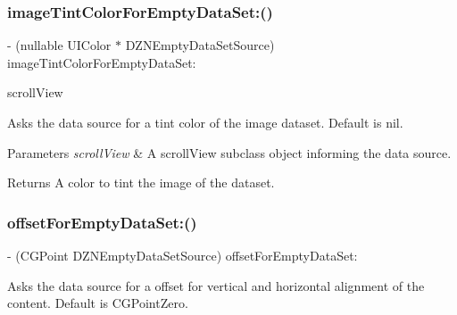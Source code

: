\subsubsection{\texorpdfstring{image\+Tint\+Color\+For\+Empty\+Data\+Set\+:()}{imageTintColorForEmptyDataSet:()}}
{\footnotesize\ttfamily -\/ (nullable U\+I\+Color $\ast$ D\+Z\+N\+Empty\+Data\+Set\+Source) image\+Tint\+Color\+For\+Empty\+Data\+Set\+: \begin{DoxyParamCaption}\item[{(U\+I\+Scroll\+View $\ast$)}]{scroll\+View }\end{DoxyParamCaption}\hspace{0.3cm}{\ttfamily [optional]}}

Asks the data source for a tint color of the image dataset. Default is nil.


\begin{DoxyParams}{Parameters}
{\em scroll\+View} & A scroll\+View subclass object informing the data source. \\
\hline
\end{DoxyParams}
\begin{DoxyReturn}{Returns}
A color to tint the image of the dataset. 
\end{DoxyReturn}
\mbox{\label{protocol_d_z_n_empty_data_set_source_01-p_ae8197d4b28e5596733af8742eaa138d5}} 
\subsubsection{\texorpdfstring{offset\+For\+Empty\+Data\+Set\+:()}{offsetForEmptyDataSet:()}}
{\footnotesize\ttfamily -\/ (C\+G\+Point D\+Z\+N\+Empty\+Data\+Set\+Source) offset\+For\+Empty\+Data\+Set\+: \begin{DoxyParamCaption}\item[{(-\/vertical\+Offset\+For\+Empty\+Data\+Set\+:\+D\+Z\+N\+Empty\+Data\+Set\+Deprecated)}]{ }\end{DoxyParamCaption}\hspace{0.3cm}{\ttfamily [optional]}}

Asks the data source for a offset for vertical and horizontal alignment of the content. Default is C\+G\+Point\+Zero.


